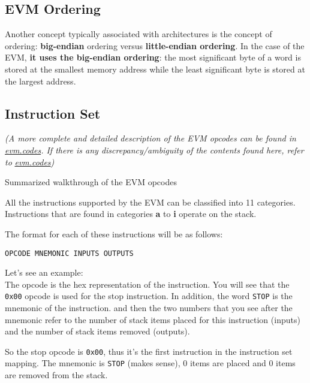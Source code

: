 \subsection{EVM Ordering}\label{evm-ordering}

Another concept typically associated with architectures is the concept
of ordering: \textbf{big-endian} ordering versus \textbf{little-endian
ordering}. In the case of the EVM, \textbf{it uses the big-endian
ordering}: the most significant byte of a word is stored at the smallest
memory address while the least significant byte is stored at the largest
address.

\subsection{Instruction Set}\label{instruction-set}

\emph{(A more complete and detailed description of the EVM opcodes can
be found in}
\href{https://www.evm.codes/?utm_source=tldrnewsletter}{\emph{evm.codes}}\emph{.
If there is any discrepancy/ambiguity of the contents found here, refer
to}
\href{https://www.evm.codes/?utm_source=tldrnewsletter}{\emph{evm.codes}}\emph{)}

Summarized walkthrough of the EVM opcodes

All the instructions supported by the EVM can be classified into 11
categories. Instructions that are found in categories \textbf{a} to
\textbf{i} operate on the stack.

The format for each of these instructions will be as follows:

\begin{lstlisting}[language=Solidity,numbers=none]
OPCODE MNEMONIC INPUTS OUTPUTS
\end{lstlisting}

\hfill\break
Let's see an example:\\

The opcode is the hex representation of the instruction. You will see
that the \texttt{0x00} opcode is used for the stop instruction. In
addition, the word \texttt{STOP} is the mnemonic of the instruction. and
then the two numbers that you see after the mnemonic refer to the number
of stack items placed for this instruction (inputs) and the number of
stack items removed (outputs).

So the stop opcode is \texttt{0x00}, thus it's the first instruction in
the instruction set mapping. The mnemonic is \texttt{STOP} (makes
sense), 0 items are placed and 0 items are removed from the stack.

